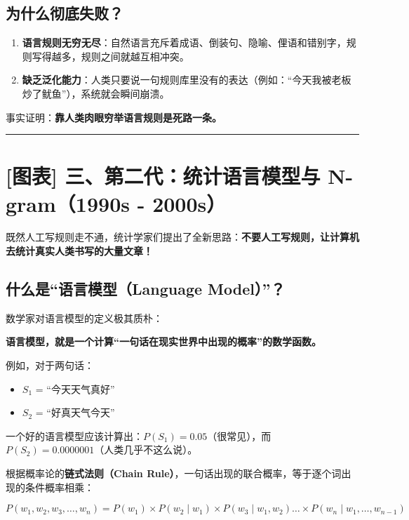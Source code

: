 \subsection{为什么彻底失败？}

\begin{enumerate}
  \item \textbf{语言规则无穷无尽}：自然语言充斥着成语、倒装句、隐喻、俚语和错别字，规则写得越多，规则之间就越互相冲突。
  \item \textbf{缺乏泛化能力}：人类只要说一句规则库里没有的表达（例如：“今天我被老板炒了鱿鱼”），系统就会瞬间崩溃。
\end{enumerate}

事实证明：\textbf{靠人类肉眼穷举语言规则是死路一条。}

\vspace{0.8em}\hrule\vspace{0.8em}

\section{[图表] 三、第二代：统计语言模型与 N-gram（1990s - 2000s）}

既然人工写规则走不通，统计学家们提出了全新思路：\textbf{不要人工写规则，让计算机去统计真实人类书写的大量文章！}

\subsection{什么是“语言模型（Language Model）”？}

数学家对语言模型的定义极其质朴：
\begin{noteBox}[核心导读与背景]
\textbf{语言模型，就是一个计算“一句话在现实世界中出现的概率”的数学函数。}
\end{noteBox}

例如，对于两句话：
\begin{itemize}
  \item $S_1$ = “今天天气真好”
  \item $S_2$ = “好真天气今天”
\end{itemize}

一个好的语言模型应该计算出：$P(S_1) = 0.05$（很常见），而 $P(S_2) = 0.0000001$（人类几乎不这么说）。

根据概率论的\textbf{链式法则（Chain Rule）}，一句话出现的联合概率，等于逐个词出现的条件概率相乘：

\[
P(w_1, w_2, w_3, \dots, w_n) = P(w_1) \times P(w_2 \mid w_1) \times P(w_3 \mid w_1, w_2) \dots \times P(w_n \mid w_1, \dots, w_{n-1})
\]

